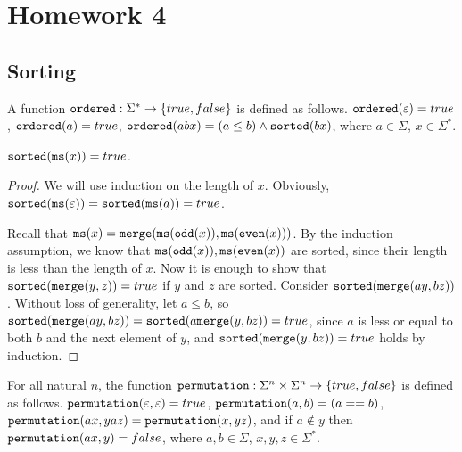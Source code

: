 

\section{Homework 4}

\subsection{Sorting}

\begin{definition}[{\tt ordered}]
    A function ${\tt ordered} : \Sigma^{*} \to \{true, false\}$ is defined as follows. ${\tt ordered}(\varepsilon) = true$, ${\tt ordered}(a) = true$, ${\tt ordered}(a b x) = (a \leq b) \wedge {\tt sorted}(b x)$, where $a \in \Sigma$, $x \in \Sigma^{*}$.
\end{definition}

\begin{lemma}
    ${\tt sorted}({\tt ms}(x)) = true$.
\end{lemma}
\begin{proof}
    We will use induction on the length of $x$. Obviously, ${\tt sorted}({\tt ms}(\varepsilon)) = {\tt sorted}({\tt ms}(a)) = true$.

    Recall that ${\tt ms}(x) = {\tt merge}({\tt ms}({\tt odd}(x)), {\tt ms}({\tt even}(x)))$. By the induction assumption, we know that ${\tt ms}({\tt odd}(x)), {\tt ms}({\tt even}(x))$ are sorted, since their length is less than the length of $x$. Now it is enough to show that ${\tt sorted}({\tt merge}(y, z)) = true$ if $y$ and $z$ are sorted. Consider ${\tt sorted}({\tt merge}(ay, bz))$. Without loss of generality, let $a \leq b$, so ${\tt sorted}({\tt merge}(ay, bz)) = {\tt sorted}(a {\tt merge}(y, bz)) = true$, since $a$ is less or equal to both $b$ and the next element of $y$, and ${\tt sorted}({\tt merge}(y, bz)) = true$ holds by induction.
\end{proof}

\begin{definition}[{\tt permutation}]
    For all natural $n$, the function ${\tt permutation} : \Sigma^n \times \Sigma^n \to \{true, false\}$ is defined as follows. ${\tt permutation}(\varepsilon, \varepsilon) = true$, ${\tt permutation}(a, b) = (a == b)$, ${\tt permutation}(ax, yaz) = {\tt permutation}(x, yz)$, and if $a \notin y$ then ${\tt permutation}(ax, y) = false$, where $a, b \in \Sigma$, $x, y, z \in \Sigma^{*}$.
\end{definition}

